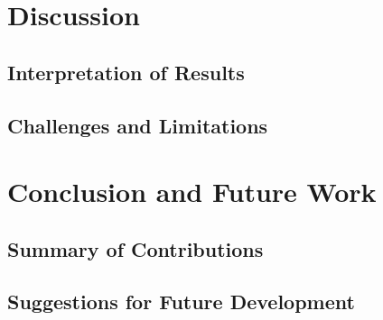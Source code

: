 \section{Discussion}
  \label{sec:discussion}

  \subsection{Interpretation of Results}
  \label{subsec:interpretation-results}

  \subsection{Challenges and Limitations}
  \label{subsec:challenges-limitations}

  \section{Conclusion and Future Work}
  \label{sec:conclusion}

  \subsection{Summary of Contributions}
  \label{subsec:summary-contributions}

  \subsection{Suggestions for Future Development}
  \label{subsec:suggestions-future-development}